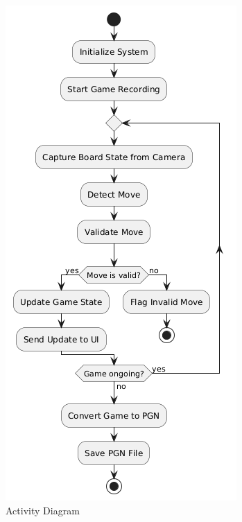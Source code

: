 \begin{figure}[h!]
\begin{minipage}[t]{0.45\textwidth}
        \includegraphics[width=\linewidth]{figures/methods/uml/activity-2.png}
        \caption[Activity Diagram]{Activity Diagram}
        \label{fig:activity}
    \end{minipage}
\end{figure}

